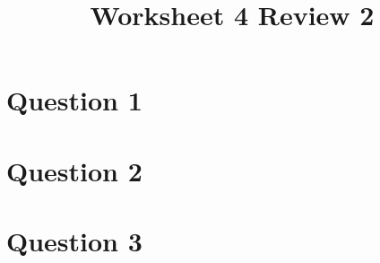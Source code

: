\documentclass[12pt]{article}
\begin{document}
\title{Worksheet 4 Review 2}
\maketitle

\section*{Question 1}

\section*{Question 2}

\section*{Question 3}
\end{document}
